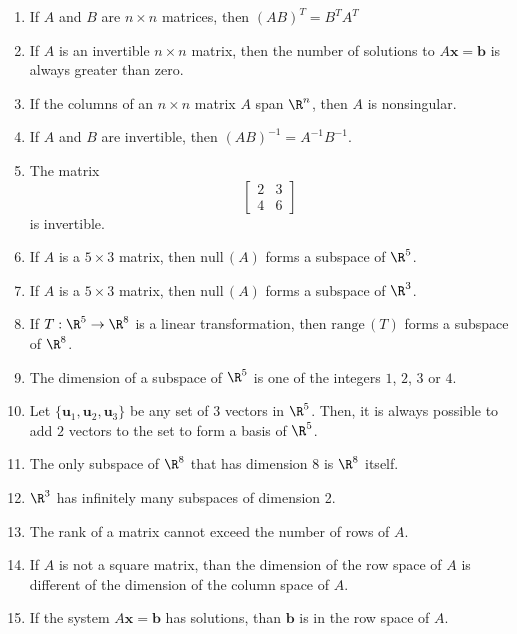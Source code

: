 \documentclass[12pt]{article}
\begin{document}
\begin{enumerate}
\item If $A$ and $B$ are $n\times n$ matrices, then $(AB)^T=B^TA^T$

\item If $A$ is an invertible $n\times n$ matrix, then the number of solutions to $A\mathbf{x}=\mathbf{b}$ is always greater than zero.

\item If the columns of an $n \times n$ matrix $A$ span $\R^n$, then $A$ is nonsingular.

\item If $A$ and $B$ are invertible, then $(AB)^{-1}=A^{-1}B^{-1}$.

\item The matrix
\[
\begin{bmatrix}2&3\\4&6\end{bmatrix}
\]
is invertible.

\item If $A$ is a $5\times 3$ matrix, then $\text{null}\,(A)$ forms a subspace of $\R^5$.

\item If $A$ is a $5\times 3$ matrix, then $\text{null}\,(A)$ forms a subspace of $\R^3$.

\item If $T:\R^5\to\R^8$ is a linear transformation, then $\text{range}\,(T)$ forms a subspace of $\R^8$.

\item The dimension of a subspace of $\R^5$ is one of the integers $1$, $2$, $3$ or $4$.

\item Let $\{\mathbf{u}_1,\mathbf{u}_2,\mathbf{u}_3\}$ be any set of $3$ vectors in $\R^5$. Then, it is always possible to add $2$ vectors to the set to form a basis of $\R^5$.

\item The only subspace of $\R^8$ that has dimension 8 is $\R^8$ itself.

\item $\R^3$ has infinitely many subspaces of dimension 2.

\item The rank of a matrix cannot exceed the number of rows of $A$.

\item If $A$ is not a square matrix, than the dimension of the row space of $A$ is different of the dimension of the column space of $A$.

\item If the system $A\mathbf{x}=\mathbf{b}$ has solutions, than $\mathbf{b}$ is in the row space of $A$.


\end{enumerate}
\end{document}
